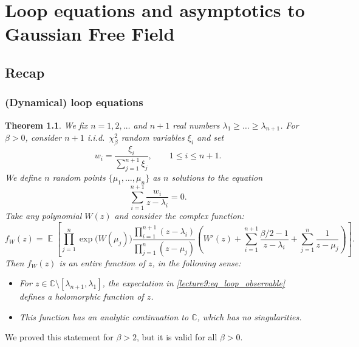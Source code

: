 \documentclass[letterpaper,11pt,oneside,reqno]{book}
\numberwithin{equation}{chapter}  %
\newtheorem{theorem}[proposition]{Theorem}
\theoremstyle{definition}
\begin{document}
\chapter{Loop equations and asymptotics to Gaussian Free Field}
\label{chap:lecture9}




\section{Recap}

\subsection{(Dynamical) loop equations}

\begin{theorem}
	\label{lecture9:Theorem_loop_equation}
 We fix $n=1,2,\dots$ and $n+1$ real numbers $\lambda_1\ge\dots\ge\lambda_{n+1}$. For $\beta>0$, consider $n+1$ i.i.d.\ $\chi^2_\beta$ random variables $\xi_i$ and set
 $$
  w_i=\frac{\xi_i}{\sum_{j=1}^{n+1} \xi_j}, \qquad 1\le i \le n+1.
 $$
 We define $n$ random points $\{\mu_1,\dots,\mu_n\}$ as $n$ solutions to the equation
 \begin{equation} \label{lecture9:eq_mu_equation}
  \sum_{i=1}^{n+1} \frac{w_i}{z-\lambda_i}=0.
 \end{equation}
 Take any \emph{polynomial} $W(z)$ and consider the complex function:
 \begin{equation}
 \label{lecture9:eq_loop_observable}
 f_W(z)=\operatorname{\mathbb{E}}\left[\prod_{j=1}^n \exp\bigl(W(\mu_j)\bigr) \frac{\prod_{i=1}^{n+1} (z-\lambda_i)}{\prod_{j=1}^n (z-\mu_j)} \left( W'(z)+\sum_{i=1}^{n+1} \frac{\beta/2-1}{z-\lambda_i} + \sum_{j=1}^n \frac{1}{z-\mu_j}\right)\right].
 \end{equation}
 Then $f_W(z)$ is an \emph{entire function} of $z$, in the following sense:
 \begin{itemize}
	 \item For $z\in \mathbb{C}\setminus [\lambda_{n+1},\lambda_1]$, the expectation in \eqref{lecture9:eq_loop_observable} defines a holomorphic function of $z$.
  \item This function has an analytic continuation to $\mathbb{C}$, which has no singularities.
 \end{itemize}
\end{theorem}

We proved this statement for $\beta>2$, but it is valid for all $\beta>0$.
\end{document}
